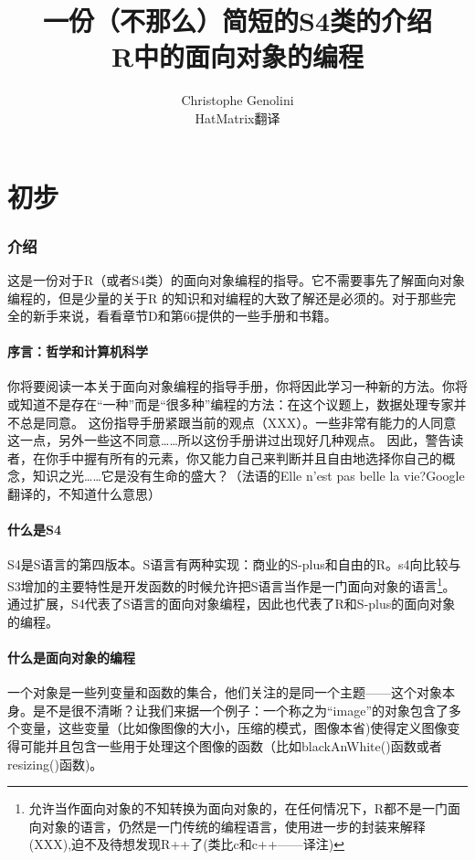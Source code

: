\documentclass[12pt,a4paper]{article}\usepackage{graphicx, color}
\title{一份（不那么）简短的S4类的介绍\\[2ex]R中的面向对象的编程}
\author{Christophe Genolini{ }\\ HatMatrix翻译}
\begin{document}
\maketitle

\part{初步}
\section{介绍}
这是一份对于R（或者S4类）的面向对象编程的指导。它不需要事先了解面向对象编程的，但是少量的关于R
的知识和对编程的大致了解还是必须的。对于那些完全的新手来说，看看章节D和第66提供的一些手册和书籍。
\subsection{序言：哲学和计算机科学}
你将要阅读一本关于面向对象编程的指导手册，你将因此学习一种新的方法。你将或知道不是存在“一种”而是“很多种”编程的方法：在这个议题上，数据处理专家并不总是同意。
这份指导手册紧跟当前的观点（XXX）。一些非常有能力的人同意这一点，另外一些这不同意……所以这份手册讲过出现好几种观点。
因此，警告读者，在你手中握有所有的元素，你又能力自己来判断并且自由地选择你自己的概念，知识之光……它是没有生命的盛大？（法语的Elle n’est pas
belle la vie?Google翻译的，不知道什么意思）

\subsection{什么是S4}
S4是S语言的第四版本。S语言有两种实现：商业的S-plus和自由的R。s4向比较与S3增加的主要特性是开发函数的时候允许把S语言当作是一门面向对象的语言\footnote{允许当作面向对象的不知转换为面向对象的，在任何情况下，R都不是一门面向对象的语言，仍然是一门传统的编程语言，使用进一步的封装来解释(XXX),迫不及待想发现R++了(类比c和c++——译注)}。通过扩展，S4代表了S语言的面向对象编程，因此也代表了R和S-plus的面向对象的编程。

\subsection{什么是面向对象的编程}
一个对象是一些列变量和函数的集合，他们关注的是同一个主题——这个对象本身。是不是很不清晰？让我们来据一个例子：一个称之为“image”的对象包含了多个变量，这些变量（比如像图像的大小，压缩的模式，图像本省)使得定义图像变得可能并且包含一些用于处理这个图像的函数（比如blackAnWhite()函数或者resizing()函数)。
\end{document}
